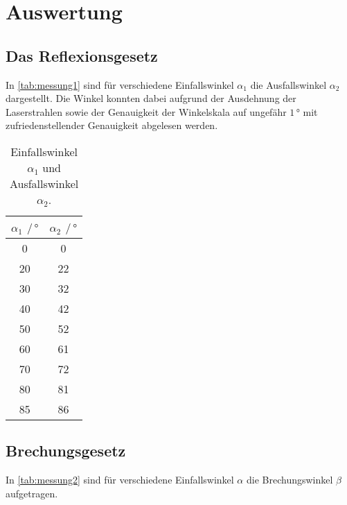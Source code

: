 \section{Auswertung}
\label{sec:auswertung}

\subsection{Das Reflexionsgesetz}

In \autoref{tab:messung1} sind für verschiedene Einfallswinkel $\alpha_1$ die Ausfallswinkel $\alpha_2$ dargestellt.
Die Winkel konnten dabei aufgrund der Ausdehnung der Laserstrahlen sowie der Genauigkeit der Winkelskala auf ungefähr $1 \,°$ mit zufriedenstellender Genauigkeit abgelesen werden.

\begin{table}[H]
    \centering
    \caption{Einfallswinkel $\alpha_1$ und Ausfallswinkel $\alpha_2$.}
    \label{tab:messung1}
    \begin{tabular}{S[table-format=2.0] S[table-format=2.0]}
      \toprule
        {$\alpha_1$ $\mathbin{/} \, \unit{\degree}$} & {$\alpha_2$ $\mathbin{/} \, \unit{\degree}$}\\
                    &               0 \\
        20              &              22 \\
        30              &              32 \\
        40              &              42 \\
        50              &              52 \\
        60              &              61 \\
        70              &              72 \\
        80              &              81 \\
        85              &              86 \\
    \bottomrule
    \end{tabular}
\end{table}


\subsection{Brechungsgesetz}
\label{subsec:brechungsgesetz}

In \autoref{tab:messung2} sind für verschiedene Einfallswinkel $\alpha$ die Brechungswinkel $\beta$ aufgetragen.

